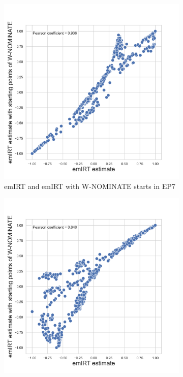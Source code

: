 \documentclass[a4paper,12pt]{report}
\begin{document}
    \begin{figure}[H]
        \centering
        \begin{subfigure}[b]{0.48\textwidth}
            \centering
            \includegraphics[width=\textwidth]{Graphs/ScatterEMEIGEN7}
            \caption{emIRT and emIRT with W-NOMINATE starts in EP7}
            \label{fig:EMEIGEN_SCATTER_7}
        \end{subfigure}
        \hfill
        \begin{subfigure}[b]{0.48\textwidth}
            \centering
            \includegraphics[width=\textwidth]{Graphs/ScatterEMEIGEN8}

\end{subfigure}
\end{figure}
\end{document}
